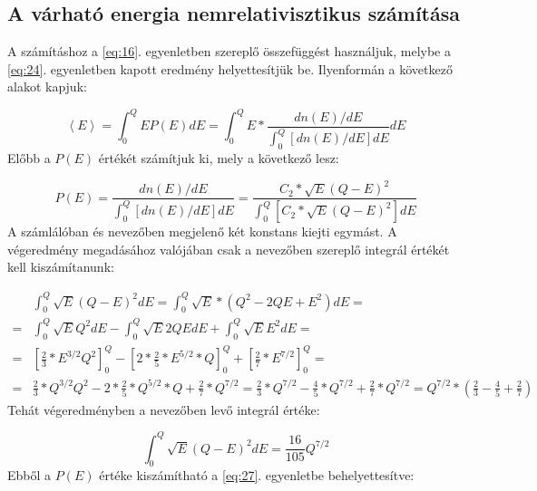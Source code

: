 \subsection{A várható energia nemrelativisztikus számítása}

A számításhoz a \ref{eq:16}. egyenletben szereplő összefüggést használjuk, melybe a \ref{eq:24}. egyenletben kapott eredmény helyettesítjük be. Ilyenformán a következő alakot kapjuk:

\begin{equation} \label{eq:27}
\left< E \right>
=
\int_{0}^{Q} E P \left( E \right) dE
=
\int_{0}^{Q} E * \frac{dn \left( E \right) / dE}{\int_{0}^{Q} \left[ dn \left( E \right) / dE \right] dE} dE
\end{equation}
Előbb a $P \left( E \right)$ értékét számítjuk ki, mely a következő lesz:

\begin{equation} \label{eq:28}
P \left( E \right)
=
\frac{dn \left( E \right) / dE}{\int_{0}^{Q} \left[ dn \left( E \right) / dE \right] dE}
=
\frac{C_{2} * \sqrt{E} \left( Q - E \right)^{2}}{\int_{0}^{Q} \left[ C_{2} * \sqrt{E} \left( Q - E \right)^{2} \right] dE}
\end{equation}
A számlálóban és nevezőben megjelenő két konstans kiejti egymást. A végeredmény megadásához valójában csak a nevezőben szereplő integrál értékét kell kiszámítanunk:

\begin{align} \label{eq:29}
&\int_{0}^{Q} \sqrt{E} \left( Q - E \right)^{2} dE
=
\int_{0}^{Q} \sqrt{E} * \left( Q^{2} - 2QE + E^{2} \right) dE
= \nonumber \\
=&
\int_{0}^{Q} \sqrt{E} Q^{2} dE
-
\int_{0}^{Q} \sqrt{E} 2QE dE
+
\int_{0}^{Q} \sqrt{E} E^{2} dE
= \nonumber \\
=&
\left[ \frac{2}{3} * E^{3/2} Q^{2} \right]_{0}^{Q}
-
\left[ 2 * \frac{2}{5} * E^{5/2} * Q \right]_{0}^{Q}
+
\left[ \frac{2}{7} * E^{7/2} \right]_{0}^{Q}
= \nonumber \\
=&
\frac{2}{3} * Q^{3/2} Q^{2} - 2 * \frac{2}{5} * Q^{5/2} * Q + \frac{2}{7} * Q^{7/2}
=
\frac{2}{3} * Q^{7/2} - \frac{4}{5} * Q^{7/2} + \frac{2}{7} * Q^{7/2}
=
Q^{7/2} * \left( \frac{2}{3} - \frac{4}{5} + \frac{2}{7} \right)
\end{align}
Tehát végeredményben a nevezőben levő integrál értéke:

\begin{equation} \label{eq:30}
\int_{0}^{Q} \sqrt{E} \left( Q - E \right)^{2} dE
=
\frac{16}{105} Q^{7/2}
\end{equation}
Ebből a $P \left( E \right)$ értéke kiszámítható a \ref{eq:27}. egyenletbe behelyettesítve:

